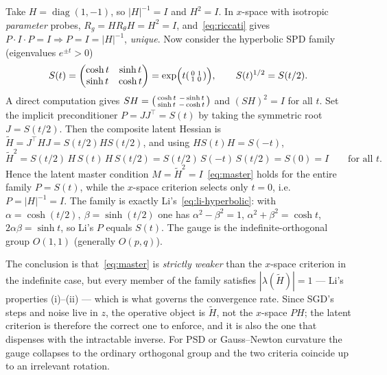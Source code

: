 \documentclass[11pt]{article}
\theoremstyle{plain}
\theoremstyle{definition}
\theoremstyle{remark}
\DeclareMathOperator{\diag}{diag}
\newcommand{\tHess}{\tilde{H}}
\begin{document}
Take $H=\diag(1,-1)$, so $|H|^{-1}=I$ and $H^2=I$. In $x$-space with isotropic
\emph{parameter} probes, $R_g=HR_\theta H=H^2=I$, and~\eqref{eq:riccati} gives
$P\cdot I\cdot P=I\Rightarrow P=I=|H|^{-1}$, \emph{unique}. Now consider the hyperbolic SPD
family (eigenvalues $e^{\pm t}>0$)
\begin{equation}
  S(t)=\begin{pmatrix}\cosh t & \sinh t\\ \sinh t & \cosh t\end{pmatrix}
      =\exp\!\Big(t\begin{psmallmatrix}0&1\\1&0\end{psmallmatrix}\Big),
  \qquad S(t)^{1/2}=S(t/2).
\end{equation}
A direct computation gives $SH=\begin{psmallmatrix}\cosh t & -\sinh t\\ \sinh t & -\cosh t\end{psmallmatrix}$
and $(SH)^2=I$ for all $t$. Set the implicit preconditioner $P=JJ^{\!\top}=S(t)$ by taking the
symmetric root $J=S(t/2)$. Then the composite latent Hessian is $\tHess=J^{\!\top}HJ=S(t/2)HS(t/2)$, and using $HS(t)H=S(-t)$,
\begin{equation}
  \tHess^2=S(t/2)\,H\,S(t)\,H\,S(t/2)=S(t/2)\,S(-t)\,S(t/2)=S(0)=I
  \qquad\text{for all }t .
\end{equation}
Hence the latent master condition $M=\tHess^2=I$~\eqref{eq:master} holds for the entire
family $P=S(t)$, while the $x$-space criterion selects only $t=0$, i.e.\ $P=|H|^{-1}=I$. The
family is exactly Li's~\eqref{eq:li-hyperbolic}: with $\alpha=\cosh(t/2),\ \beta=\sinh(t/2)$
one has $\alpha^2-\beta^2=1$, $\alpha^2+\beta^2=\cosh t$, $2\alpha\beta=\sinh t$, so Li's $P$
equals $S(t)$. The gauge is the indefinite-orthogonal group $O(1,1)$ (generally $O(p,q)$).

The conclusion is that~\eqref{eq:master} is \emph{strictly weaker} than the $x$-space
criterion in the indefinite case, but every member of the family satisfies
$|\lambda(\tHess)|=1$ --- Li's properties (i)--(ii) --- which is what governs the convergence
rate. Since SGD's steps and noise live in $z$, the operative object is $\tHess$, not the
$x$-space $PH$; the latent criterion is therefore the correct one to enforce, and it is also
the one that dispenses with the intractable inverse. For PSD or Gauss--Newton curvature the
gauge collapses to the ordinary orthogonal group and the two criteria coincide up to an
irrelevant rotation.
\end{document}
